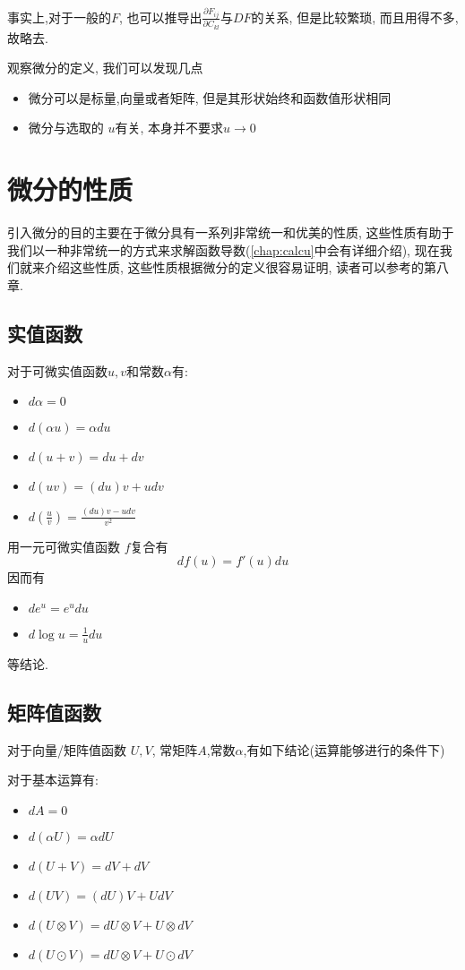\documentclass{ctexbook}
\begin{document}
事实上,对于一般的$F$, 也可以推导出$\frac{\partial F_{ij}}{\partial C_{kl}}$与$DF$的关系, 但是比较繁琐, 而且用得不多, 故略去.

观察微分的定义, 我们可以发现几点
\begin{itemize}
  \item 微分可以是标量,向量或者矩阵, 但是其形状始终和函数值形状相同
  \item 微分与选取的 $u$有关, 本身并不要求$u \rightarrow 0$
\end{itemize}



\section{微分的性质}
引入微分的目的主要在于微分具有一系列非常统一和优美的性质, 这些性质有助于我们以一种非常统一的方式来求解函数导数(\ref{chap:calcu}中会有详细介绍), 现在我们就来介绍这些性质, 这些性质根据微分的定义很容易证明, 读者可以参考\cite{magnus99}的第八章.

\subsection{实值函数}
对于可微实值函数$u, v$和常数$\alpha$有:
\begin{itemize}
  \item $d\alpha = 0$
  \item $d(\alpha u) = \alpha du$
  \item $d(u+v) = du + dv$
  \item $d(uv) = (du)v + udv$
  \item $d(\frac{u}{v}) = \frac{(du)v - udv}{v^2}$
\end{itemize}

用一元可微实值函数 $f$复合有
\begin{equation*}
  df(u) = f'(u) du
\end{equation*}
因而有
\begin{itemize}
  \item $de^u = e^udu$
  \item $d\log u = \frac{1}{u}du$
\end{itemize}
等结论.

\subsection{矩阵值函数}
对于向量/矩阵值函数 $U, V$, 常矩阵$A$,常数$\alpha$,有如下结论(运算能够进行的条件下)

对于基本运算有:
\begin{itemize}
  \item $dA = 0$
  \item $d(\alpha U) = \alpha dU$
  \item $d(U+V) = dV + dV$
  \item $d(UV) = (dU)V + UdV$
  \item $d(U\otimes V)=dU\otimes V + U\otimes dV$
  \item $d(U\odot V)=dU\otimes V + U\odot dV$
\end{itemize}
\end{document}
